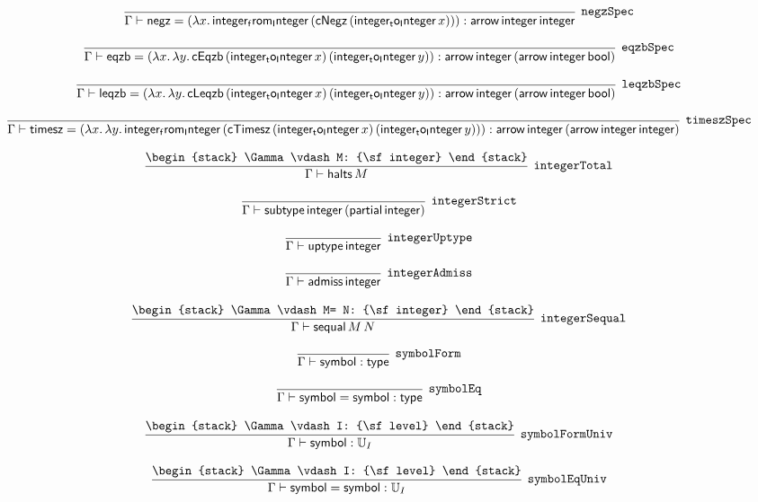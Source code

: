 \[
\infer[{\tt negzSpec}]{\Gamma \vdash {\sf negz}= (\lambda x.\,{\sf integer_from_Integer}\,({\sf cNegz}\,({\sf integer_to_Integer}\,x))): {\sf arrow}\,{\sf integer}\,{\sf integer}}{}
\]

\[
\infer[{\tt eqzbSpec}]{\Gamma \vdash {\sf eqzb}= (\lambda x.\,\lambda y.\,{\sf cEqzb}\,({\sf integer_to_Integer}\,x)\,({\sf integer_to_Integer}\,y)): {\sf arrow}\,{\sf integer}\,({\sf arrow}\,{\sf integer}\,{\sf bool})}{}
\]

\[
\infer[{\tt leqzbSpec}]{\Gamma \vdash {\sf leqzb}= (\lambda x.\,\lambda y.\,{\sf cLeqzb}\,({\sf integer_to_Integer}\,x)\,({\sf integer_to_Integer}\,y)): {\sf arrow}\,{\sf integer}\,({\sf arrow}\,{\sf integer}\,{\sf bool})}{}
\]

\[
\infer[{\tt timeszSpec}]{\Gamma \vdash {\sf timesz}= (\lambda x.\,\lambda y.\,{\sf integer_from_Integer}\,({\sf cTimesz}\,({\sf integer_to_Integer}\,x)\,({\sf integer_to_Integer}\,y))): {\sf arrow}\,{\sf integer}\,({\sf arrow}\,{\sf integer}\,{\sf integer})}{}
\]

\[
\infer[{\tt integerTotal}]{\Gamma \vdash {\sf halts}\,M}{
\begin{stack}
\Gamma \vdash M: {\sf integer}
\end{stack}}
\]

\[
\infer[{\tt integerStrict}]{\Gamma \vdash {\sf subtype}\,{\sf integer}\,({\sf partial}\,{\sf integer})}{}
\]

\[
\infer[{\tt integerUptype}]{\Gamma \vdash {\sf uptype}\,{\sf integer}}{}
\]

\[
\infer[{\tt integerAdmiss}]{\Gamma \vdash {\sf admiss}\,{\sf integer}}{}
\]

\[
\infer[{\tt integerSequal}]{\Gamma \vdash {\sf sequal}\,M\,N}{
\begin{stack}
\Gamma \vdash M= N: {\sf integer}
\end{stack}}
\]

\[
\infer[{\tt symbolForm}]{\Gamma \vdash {\sf symbol}: {\sf type}}{}
\]

\[
\infer[{\tt symbolEq}]{\Gamma \vdash {\sf symbol}= {\sf symbol}: {\sf type}}{}
\]

\[
\infer[{\tt symbolFormUniv}]{\Gamma \vdash {\sf symbol}: {\Bbb U}_{I}}{
\begin{stack}
\Gamma \vdash I: {\sf level}
\end{stack}}
\]

\[
\infer[{\tt symbolEqUniv}]{\Gamma \vdash {\sf symbol}= {\sf symbol}: {\Bbb U}_{I}}{
\begin{stack}
\Gamma \vdash I: {\sf level}
\end{stack}}
\]

